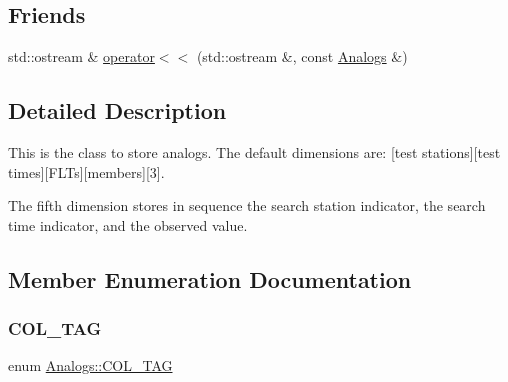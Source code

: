 \subsection*{Friends}
\begin{DoxyCompactItemize}
\item 
std\+::ostream \& \mbox{\hyperlink{class_analogs_a8b1c62cad49a019ac1733168d179cf73}{operator$<$$<$}} (std\+::ostream \&, const \mbox{\hyperlink{class_analogs}{Analogs}} \&)
\end{DoxyCompactItemize}


\subsection{Detailed Description}
This is the class to store analogs. The default dimensions are\+: \mbox{[}test stations\mbox{]}\mbox{[}test times\mbox{]}\mbox{[}F\+L\+Ts\mbox{]}\mbox{[}members\mbox{]}\mbox{[}3\mbox{]}. 

The fifth dimension stores in sequence the search station indicator, the search time indicator, and the observed value. 

\subsection{Member Enumeration Documentation}
\mbox{\label{class_analogs_a9b56dcdb212f44c3ba40a60736d648bb}} 
\subsubsection{\texorpdfstring{C\+O\+L\+\_\+\+T\+AG}{COL\_TAG}}
{\footnotesize\ttfamily enum \mbox{\hyperlink{class_analogs_a9b56dcdb212f44c3ba40a60736d648bb}{Analogs\+::\+C\+O\+L\+\_\+\+T\+AG}}}

